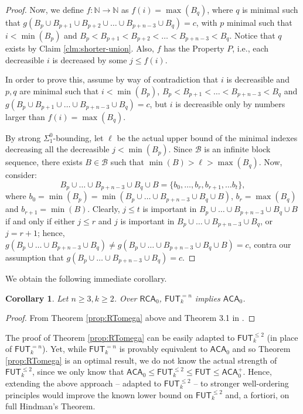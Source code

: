 \documentclass{amsart}
\newcommand\Nat{\mathbb{N}}
\newcommand\RCA{\mathsf{RCA}}
\newcommand\ACA{\mathsf{ACA}}
\newcommand\FUT{\mathsf{FUT}}
\newtheorem{corollary}{Corollary}
\begin{document}
\begin{proof}
\bigskip

Now, we define $f: \Nat \to \Nat$ as $f(i) = \max(B_q)$, where $q$ is minimal such that $g(B_p \cup B_{p+1} \cup B_{p+2} \cup \ldots \cup B_{p+n-3} \cup B_q) =c$, with $p$ minimal such that $i < \min(B_p)$ and $B_p < B_{p+1} < B_{p+2} < \ldots < B_{p+n-3} < B_q$. Notice that $q$ exists by Claim \ref{clm:shorter-union}. Also, $f$ has the Property $P$, i.e., each decreasible $i$ is decreased by some $j \leq f(i)$.

In order to prove this, assume by way of contradiction that $i$ is decreasible and $p,q$ are minimal such that $i < \min(B_p)$, $B_p < B_{p+1} < \ldots < B_{p+n-3} < B_q$ and $g(B_p \cup B_{p+1} \cup \ldots \cup B_{p+n-3} \cup B_q) = c$, but $i$ is decreasible only by numbers larger than $f(i) = \max(B_q)$. 

By strong $\Sigma^0_1$-bounding, let $\ell$ be the actual upper bound of the minimal indexes decreasing all the decreasible $j < \min(B_p)$. Since $\mathcal{B}$ is an infinite block sequence, there exists $B \in \mathcal{B}$ such that $\min(B) > \ell > \max(B_q)$. Now, consider:
$$
B_p \cup \ldots \cup B_{p+n-3} \cup B_q \cup B = \{b_0, \ldots, b_r, b_{r+1}, \ldots b_t\},$$
where $b_0 = \min(B_p) = \min(B_p \cup \ldots \cup B_{p+n-3} \cup B_q \cup B)$, $b_r = \max(B_q)$ and $b_{r+1} = \min(B)$. Clearly, $j \leq t$ is important in $B_p \cup \ldots \cup B_{p+n-3} \cup B_q \cup B$ if and only if either $j \leq r$ and $j$ is important in $B_p \cup \ldots \cup B_{p+n-3} \cup B_q$, or $j = r + 1$; hence, $g(B_p \cup \ldots \cup B_{p+n-3} \cup B_q) \neq g(B_p \cup \ldots \cup B_{p+n-3} \cup B_q \cup B) = c$, contra our assumption that $g(B_p \cup \ldots \cup B_{p+n-3} \cup B_q) = c$.
\end{proof}

We obtain the following immediate corollary. 

\begin{corollary}
Let $n \geq 3, k \geq 2$. Over $\RCA_0$, $\FUT^{=n}_k$ implies $\ACA_0$. 
\end{corollary}

\begin{proof}
From Theorem \ref{prop:RTomega} above and Theorem 3.1 in \cite{CKLZ:20}.
\end{proof}

The proof of Theorem \ref{prop:RTomega} can be easily adapted to $\FUT^{\leq 2}_k$ (in place of $\FUT^{=n}_k$). Yet, while $\FUT^{=n}_k$ is provably equivalent to $\ACA_0$ and so Theorem \ref{prop:RTomega} is an optimal result, we do not know the actual strength of $\FUT^{\leq 2}_k$, since we only know that $\ACA_0 \leq \FUT^{\leq 2}_k \leq \FUT \leq \ACA_0^+$. Hence, extending the above approach -- adapted to $\FUT^{\leq 2}_k$ -- to stronger well-ordering principles would improve the known lower bound on $\FUT^{\leq 2}_k$ and, a fortiori, on full Hindman's Theorem.
\end{document}
